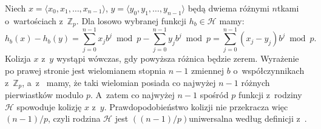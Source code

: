 \exercise %

\noindent Niech $x=\langle x_0,x_1,\dots,x_{n-1}\rangle$, $y=\langle y_0,y_1,\dots,y_{n-1}\rangle$ będą dwiema różnymi $n$\nbhyphen tkami o~wartościach z~$\mathbb{Z}_p$.
Dla losowo wybranej funkcji $h_b\in\mathcal{H}$ mamy:
\[
	h_b(x)-h_b(y) = \sum_{j=0}^{n-1}x_jb^j\bmod p-\sum_{j=0}^{n-1}y_jb^j\bmod p = \sum_{j=0}^{n-1}(x_j-y_j)b^j\bmod p.
\]
Kolizja $x$ z~$y$ wystąpi wówczas, gdy powyższa różnica będzie zerem.
Wyrażenie po prawej stronie jest wielomianem stopnia $n-1$ zmiennej $b$ o~współczynnikach z~$\mathbb{Z}_p$, a~z~ mamy, że taki wielomian posiada co najwyżej $n-1$ różnych pierwiastków modulo $p$.
A~zatem co najwyżej $n-1$ spośród $p$ funkcji z~rodziny $\mathcal{H}$ spowoduje kolizję $x$ z~$y$.
Prawdopodobieństwo kolizji nie przekracza więc $(n-1)/p$, czyli rodzina $\mathcal{H}$ jest $((n-1)/p)$\nbhyphen uniwersalna według definicji z~.
